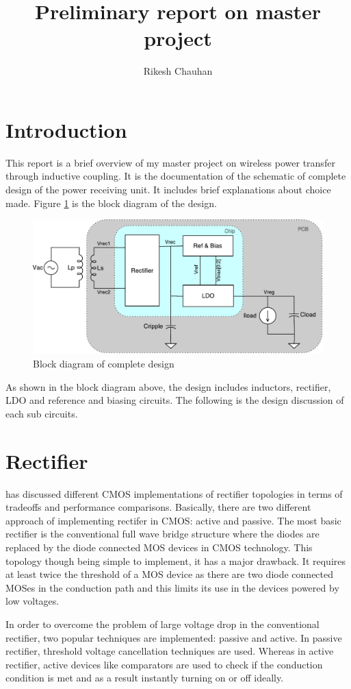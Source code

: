\documentclass[12pt,a4paper,UKenglish]{article}
\title{Preliminary report on master project}
\author{Rikesh Chauhan}
\date{}
\begin{document}
\maketitle

\section{Introduction}
This report is a brief overview of my master project on wireless power transfer through inductive coupling. It is the documentation of the schematic of complete design of the power receiving unit. It includes brief explanations about choice made. Figure \ref{fig:blockd} is the block diagram of the design.

\begin{figure}[htbp] %
   \centering
   \includegraphics[width=\textwidth]{img/block_diagram.pdf} 
   \caption{Block diagram of complete design}
   \label{fig:blockd}
\end{figure}

As shown in the block diagram above, the design includes inductors, rectifier, LDO and reference and biasing circuits. The following is the design discussion of each sub circuits.

\section{Rectifier}

\cite{rectcomp} has discussed different CMOS implementations of rectifier topologies in terms of tradeoffs and performance comparisons. 
Basically, there are two different approach of implementing rectifer in CMOS: active and passive.
The most basic rectifier is  the conventional full wave bridge structure where the diodes are replaced by the diode connected MOS devices in CMOS technology. This topology though being simple to implement, it has a major drawback. It requires at least twice the threshold of a MOS device as there are two diode connected MOSes in the conduction path and this limits its use in the devices powered by low voltages. 

In order to overcome the problem of large voltage drop in the conventional rectifier, two popular techniques are implemented: passive and active. In passive rectifier, threshold voltage cancellation techniques are used. Whereas in active rectifier, active devices like comparators are used to check if the conduction condition is met and as a result instantly turning on or off ideally.

\newpage
\printbibliography
\end{document}

